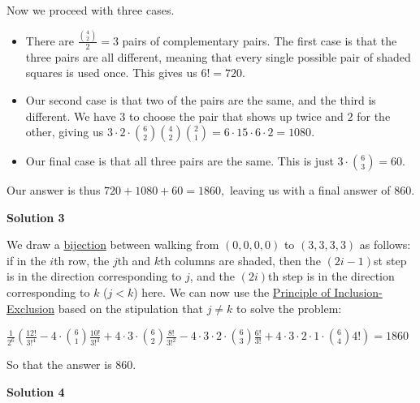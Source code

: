 \begin{enumerate}
 Now we proceed with three cases.

 
            \begin{itemize}
        \item There are $\frac{\binom42}2=3$ pairs of complementary pairs. The first case is that the three pairs are all different, meaning that every single possible pair of shaded squares is used once. This gives us $6!=720.$
            \end{itemize}
            
            \begin{itemize}
        \item Our second case is that two of the pairs are the same, and the third is different. We have $3$ to choose the pair that shows up twice and $2$ for the other, giving us $3\cdot2\cdot\binom62\binom42\binom21=6\cdot15\cdot6\cdot2=1080.$
            \end{itemize}
            
            \begin{itemize}
        \item Our final case is that all three pairs are the same. This is just $3\cdot\binom63=60.$
            \end{itemize}
            Our answer is thus $720+1080+60=1860,$ leaving us with a final answer of $\boxed{860}.$




\textbf{Solution 3}

We draw a \href{https://artofproblemsolving.com/wiki/index.php?title=Bijection}{bijection} between walking from $(0,0,0,0)$ to $(3,3,3,3)$ as follows: if in the $i$th row, the $j$th and $k$th columns are shaded, then the $(2i-1)$st step is in the direction corresponding to $j$, and the $(2i)$th step is in the direction corresponding to $k$ ($j < k$) here. We can now use the \href{https://artofproblemsolving.com/wiki/index.php?title=Principle\_of\_Inclusion-Exclusion}{Principle of Inclusion-Exclusion} based on the stipulation that $j\ne k$ to solve the problem:

 $\frac{1}{2^6}\left(\frac{12!}{3!^4}-4\cdot{6 \choose 1}\frac{10!}{3!^3}+4\cdot 3\cdot{6 \choose 2}\frac{8!}{3!^2}-4\cdot 3\cdot 2\cdot{6 \choose 3}\frac{6!}{3!}+4\cdot 3\cdot 2\cdot 1\cdot {6 \choose 4}4!\right) = 1860$

 So that the answer is $860$.

 



\textbf{Solution 4}


\end{enumerate}
